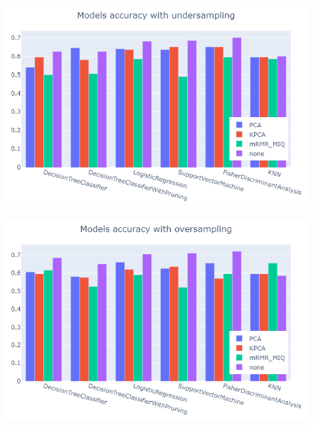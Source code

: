 \documentclass[letterpaper]{article}
\begin{document}
\begin{figure}[!h]
\begin{minipage}[t]{0.45\textwidth}
		\end{minipage}
		\begin{minipage}[t]{0.45\textwidth}
			\includegraphics[width=\textwidth]{images/models_accuracy_with_undersampling.png}
			\setlength{\abovecaptionskip}{-10pt}
			\label{fig:30}
		\end{minipage}
		\begin{minipage}{0.05\textwidth}
			\quad
		\end{minipage}
		\begin{minipage}[t]{0.45\textwidth}
			\includegraphics[width=\textwidth]{images/models_accuracy_with_oversampling.png}
			\setlength{\abovecaptionskip}{-10pt}
			\label{fig:31}
		\end{minipage}
	\end{figure}
	
	\clearpage
	\printbibliography
	\nocite{MohriRostamizadehTalwalkar18}
	\nocite{understandingml}
	\nocite{ghojogh2019fisher}

	
\end{document}
